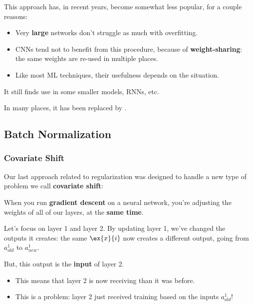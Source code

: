         

        \phantom{}

        This approach has, in recent years, become somewhat less popular, for a couple reasons:

        \begin{itemize}
            \item Very \textbf{large} networks don't struggle as much with overfitting.
            
            \item CNNs tend not to benefit from this procedure, because of \textbf{weight-sharing}: the same weights are re-used in multiple places.

            \item Like most ML techniques, their usefulness depends on the situation.
        \end{itemize}

        It still finds use in some smaller models, RNNs, etc.

        In many places, it has been replaced by .

    \pagebreak

    \subsection{Batch Normalization}

        \subsubsection{Covariate Shift}

            Our last approach related to regularization was designed to handle a new type of problem we call \textbf{covariate shift}:
            
            When you run \textbf{gradient descent} on a neural network, you're adjusting the weights of all of our layers, at the \textbf{same time}.
    
            Let's focus on layer 1 and layer 2. By updating layer 1, we've changed the outputs it creates: the same $\ex{x}{i}$ now creates a different output, going from $a^1_{old}$ to $a^1_{new}$.
    
            But, this output is the \textbf{input} of layer 2.
            
            \begin{itemize}
                \item This means that layer 2 is now receiving  than it was before.
                    
                \item This is a problem: layer 2 just received training based on the  inputs $a^1_{old}$!
            \end{itemize}
    
